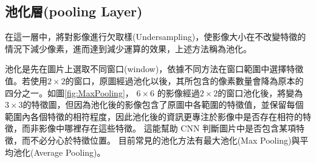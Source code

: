 \subsection{池化層(pooling Layer)}
在這一層中，將對影像進行欠取樣(Undersampling)，使影像大小在不改變特徵的情況下減少像素，進而達到減少運算的效果，上述方法稱為池化。

池化是先在圖片上選取不同窗口(window)，依據不同方法在窗口範圍中選擇特徵值。若使用\(2 \times 2\)的窗口，原圖經過池化以後，其所包含的像素數量會降為原本的四分之一。如圖\ref{fig:MaxPooling}， \(6 \times6\) 的影像經過\(2 \times 2\)的窗口池化後，將變為\(3 \times 3\)的特徵圖，但因為池化後的影像包含了原圖中各範圍的特徵值，並保留每個範圍內各個特徵的相符程度，因此池化後的資訊更專注於影像中是否存在相符的特徵，而非影像中哪裡存在這些特徵。
這能幫助 CNN 判斷圖片中是否包含某項特徵，而不必分心於特徵位置。
目前常見的池化方法有最大池化(Max Pooling)與平均池化(Average Pooling)。


